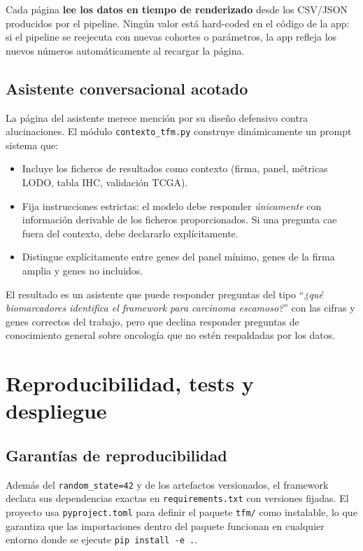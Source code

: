 Cada página \textbf{lee los datos en tiempo de renderizado} desde los
CSV/JSON producidos por el pipeline. Ningún valor está hard-coded en el
código de la app: si el pipeline se reejecuta con nuevas cohortes o
parámetros, la app refleja los nuevos números automáticamente al
recargar la página.

\subsection{Asistente conversacional acotado}

La página del asistente merece mención por su diseño defensivo contra
alucinaciones. El módulo \texttt{contexto\_tfm.py} construye
dinámicamente un prompt sistema que:

\begin{itemize}[leftmargin=1.2em]
  \item Incluye los ficheros de resultados como contexto (firma,
  panel, métricas LODO, tabla IHC, validación TCGA).
  \item Fija instrucciones estrictas: el modelo debe responder
  \emph{únicamente} con información derivable de los ficheros
  proporcionados. Si una pregunta cae fuera del contexto, debe
  declararlo explícitamente.
  \item Distingue explícitamente entre genes del panel mínimo, genes
  de la firma amplia y genes no incluidos.
\end{itemize}

El resultado es un asistente que puede responder preguntas del tipo
``\emph{¿qué biomarcadores identifica el framework para carcinoma
escamoso?}'' con las cifras y genes correctos del trabajo, pero que
declina responder preguntas de conocimiento general sobre oncología
que no estén respaldadas por los datos.

\section{Reproducibilidad, tests y despliegue}
\label{sec:dev_reproducibilidad}

\subsection{Garantías de reproducibilidad}

Además del \texttt{random\_state=42} y de los artefactos versionados,
el framework declara sus dependencias exactas en
\texttt{requirements.txt} con versiones fijadas. El proyecto usa
\texttt{pyproject.toml} para definir el paquete \texttt{tfm/} como
instalable, lo que garantiza que las importaciones dentro del paquete
funcionan en cualquier entorno donde se ejecute
\texttt{pip install -e .}.

